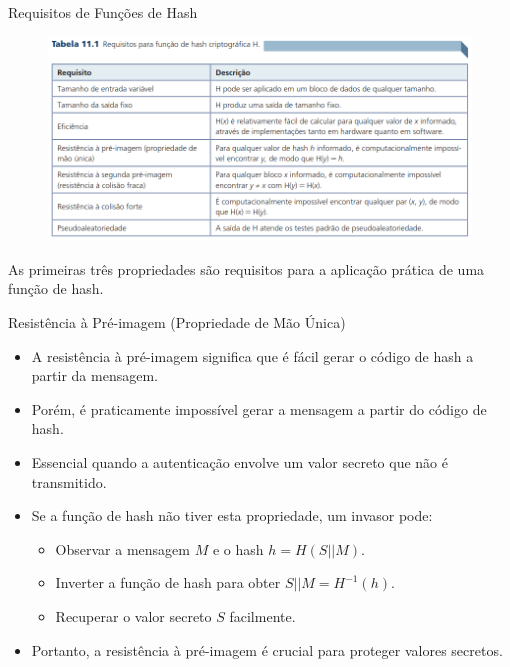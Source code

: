 \begin{frame}{Requisitos de Funções de Hash}
    
\begin{figure}
    \centering
    \includegraphics[width=0.9\linewidth]{Figuras/requisitos-funcao-hash.png}

\end{figure}
As primeiras três
propriedades são requisitos para a aplicação prática de uma função de hash.
\end{frame}

\begin{frame}{Resistência à Pré-imagem (Propriedade de Mão Única)}
    \begin{itemize}
        \item A resistência à pré-imagem significa que é fácil gerar o código de hash a partir da mensagem.
        \item Porém, é praticamente impossível gerar a mensagem a partir do código de hash.
        \item Essencial quando a autenticação envolve um valor secreto que não é transmitido.
        \item Se a função de hash não tiver esta propriedade, um invasor pode:
        \begin{itemize}
            \item Observar a mensagem $M$ e o hash $h = H(S || M)$.
            \item Inverter a função de hash para obter $S || M = H^{-1}(h)$.
            \item Recuperar o valor secreto $S$ facilmente.
        \end{itemize}
        \item Portanto, a resistência à pré-imagem é crucial para proteger valores secretos.
    \end{itemize}
\end{frame}

